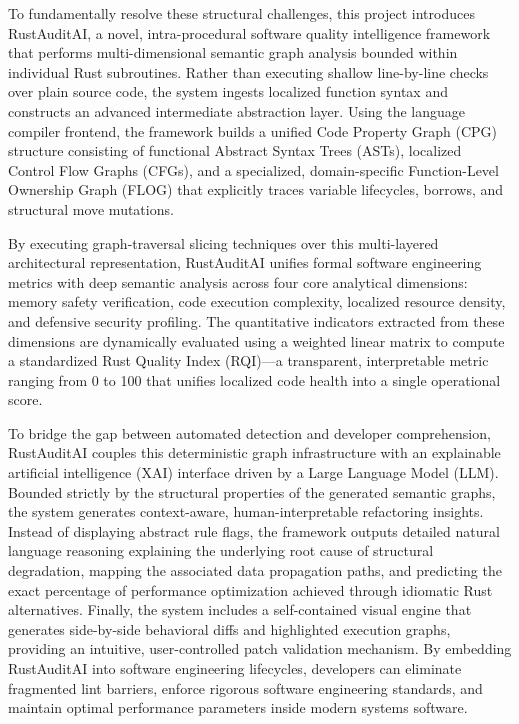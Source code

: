\par To fundamentally resolve these structural challenges, this project introduces RustAuditAI, a novel, intra-procedural software quality intelligence framework that performs multi-dimensional semantic graph analysis bounded within individual Rust subroutines. Rather than executing shallow line-by-line checks over plain source code, the system ingests localized function syntax and constructs an advanced intermediate abstraction layer. Using the language compiler frontend, the framework builds a unified Code Property Graph (CPG) structure consisting of functional Abstract Syntax Trees (ASTs), localized Control Flow Graphs (CFGs), and a specialized, domain-specific Function-Level Ownership Graph (FLOG) that explicitly traces variable lifecycles, borrows, and structural move mutations. 

\par By executing graph-traversal slicing techniques over this multi-layered architectural representation, RustAuditAI unifies formal software engineering metrics with deep semantic analysis across four core analytical dimensions: memory safety verification, code execution complexity, localized resource density, and defensive security profiling. The quantitative indicators extracted from these dimensions are dynamically evaluated using a weighted linear matrix to compute a standardized Rust Quality Index (RQI)—a transparent, interpretable metric ranging from 0 to 100 that unifies localized code health into a single operational score.

\par To bridge the gap between automated detection and developer comprehension, RustAuditAI couples this deterministic graph infrastructure with an explainable artificial intelligence (XAI) interface driven by a Large Language Model (LLM). Bounded strictly by the structural properties of the generated semantic graphs, the system generates context-aware, human-interpretable refactoring insights. Instead of displaying abstract rule flags, the framework outputs detailed natural language reasoning explaining the underlying root cause of structural degradation, mapping the associated data propagation paths, and predicting the exact percentage of performance optimization achieved through idiomatic Rust alternatives. Finally, the system includes a self-contained visual engine that generates side-by-side behavioral diffs and highlighted execution graphs, providing an intuitive, user-controlled patch validation mechanism. By embedding RustAuditAI into software engineering lifecycles, developers can eliminate fragmented lint barriers, enforce rigorous software engineering standards, and maintain optimal performance parameters inside modern systems software.
